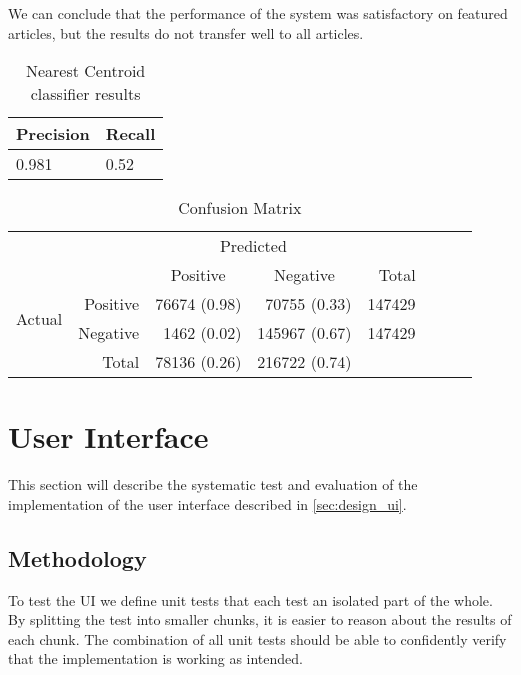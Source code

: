 We can conclude that the performance of the system was satisfactory on featured articles, but the results do not transfer well to all articles. 

\begin{table}[htbp]
\centering
\begin{tabular}{@{}ll@{}}
\toprule
Precision     & Recall       \\ \midrule
\num{0.981} & \num{0.52} \\
\bottomrule
\end{tabular}
\caption[Nearest Centroid classifier results]{Nearest Centroid classifier results}\label{eval-results}
\end{table}

\begin{table}[htbp]
    \centering
     \begin{tabular}{rrrrrrrr}
      \toprule
      \multicolumn{2}{c}{} & \multicolumn{2}{c}{Predicted} & \\
      \cmidrule{3-4}
      \multicolumn{2}{c}{} & \multicolumn{1}{c}{Positive} & \multicolumn{1}{c}{Negative} & Total \\
      \midrule
      \multirow{2}{*}{Actual} & Positive & \num{76674} (0.98) & \num{70755} (0.33)  & \num{147429} \\
                              & Negative & \num{1462} (0.02)  & \num{145967} (0.67) & \num{147429} \\
                              \cmidrule{1-2}
                              & Total    & \num{78136} (0.26) & \num{216722} (0.74) \\
      \bottomrule
    \end{tabular}
    \caption[Confusion Matrix]{Confusion Matrix}%
    \label{tab:confusionmatrix}
\end{table}

\section{User Interface}
This section will describe the systematic test and evaluation of the implementation of the user interface described in \cref{sec:design_ui}.

\subsection{Methodology}
To test the UI we define unit tests that each test an isolated part of the whole. By splitting the test into smaller chunks, it is easier to reason about the results of each chunk. The combination of all unit tests should be able to confidently verify that the implementation is working as intended.

